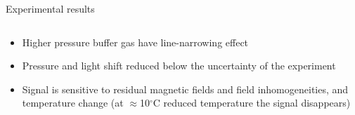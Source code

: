 \begin{block}{Experimental results}
\begin{columns}
\begin{column}{.49\textwidth}
\begin{center}
      \end{center}
    \end{column}
    \end{columns}
    \begin{itemize}
    \item Higher pressure buffer gas have line-narrowing effect
    \item Pressure and light shift reduced below the uncertainty of the experiment
    \item Signal is sensitive to residual magnetic fields and field inhomogeneities, and temperature change (at $\approx$10$^\circ$C reduced temperature the signal disappears)
    \end{itemize}
\end{block}
